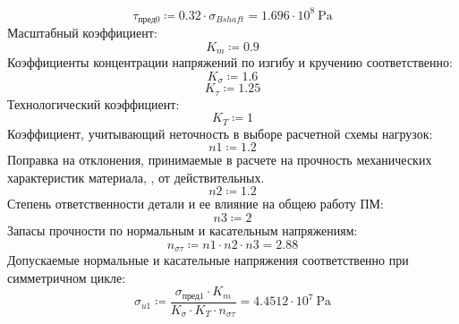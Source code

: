 \documentclass{article}
\newcommand{\defeq}{\coloneq} %
\begin{document}
\begin{equation*}
\textit{τ}_{\textit{пред0}} \defeq 0.32 \cdot σ_{Bshaft} = {1.696 \cdot 10^{8} \: \mathrm{Pa}}
\end{equation*}
\colorbox[HTML]{000000}{Масштабный коэффициент:}\newline
\begin{equation*}
K_{m} \defeq 0.9
\end{equation*}
\colorbox[HTML]{000000}{Коэффициенты концентрации напряжений по изгибу и кручению соответственно:}\newline
\begin{equation*}
K_{σ} \defeq 1.6
\end{equation*}
\begin{equation*}
K_{τ} \defeq 1.25
\end{equation*}
\colorbox[HTML]{000000}{Технологический коэффициент:}\newline
\begin{equation*}
K_{T} \defeq 1
\end{equation*}
\colorbox[HTML]{000000}{Коэффициент, учитывающий неточность в выборе расчетной схемы нагрузок:}\newline
\begin{equation*}
\textit{n1} \defeq 1.2
\end{equation*}
\colorbox[HTML]{000000}{Поправка на отклонения, принимаемые в расчете на прочность механических характеристик материала, , от действительных.}\newline
\begin{equation*}
\textit{n2} \defeq 1.2
\end{equation*}
\colorbox[HTML]{000000}{Степень ответственности детали и ее влияние на общею работу ПМ:}\newline
\begin{equation*}
\textit{n3} \defeq 2
\end{equation*}
\colorbox[HTML]{000000}{Запасы прочности по нормальным и касательным напряжениям:}\newline
\begin{equation*}
n_{στ} \defeq \textit{n1} \cdot \textit{n2} \cdot \textit{n3} = {2.88}
\end{equation*}
\colorbox[HTML]{000000}{Допускаемые нормальные и касательные напряжения соответственно при симметричном цикле:}\newline
\begin{equation*}
\textit{σ}_{\textit{u1}} \defeq \frac{\textit{σ}_{\textit{пред1}} \cdot K_{m}}{K_{σ} \cdot K_{T} \cdot n_{στ}} = {4.4512 \cdot 10^{7} \: \mathrm{Pa}}
\end{equation*}
\end{document}
